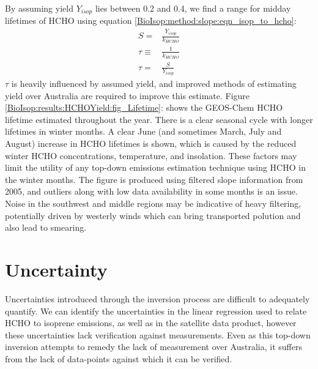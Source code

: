     By assuming yield $Y_{isop}$ lies between 0.2 and 0.4, we find a range for midday lifetimes of HCHO using equation \ref{BioIsop:method:slope:eqn_isop_to_hcho}:
    \begin{eqnarray*}
      S = & \frac{Y_{isop}}{k_{HCHO}} \\
      \tau \equiv & \frac{1}{k_{HCHO}} \\
      \tau = & \frac{S}{Y_{isop}}
    \end{eqnarray*}
    $\tau$ is heavily influenced by assumed yield, and improved methods of estimating yield over Australia are required to improve this estimate.
    Figure \ref{BioIsop:results:HCHOYield:fig_Lifetime}: shows the GEOS-Chem HCHO lifetime estimated throughout the year.
    There is a clear seasonal cycle with longer lifetimes in winter months.
    A clear June (and sometimes March, July and August) increase in HCHO lifetimes is shown, which is caused by the reduced winter HCHO concentrations, temperature, and insolation.
    These factors may limit the utility of any top-down emissions estimation technique using HCHO in the winter months.
    The figure is produced using filtered slope information from 2005, and outliers along with low data availability in some months is an issue.
    Noise in the southwest and middle regions may be indicative of heavy filtering, potentially driven by westerly winds which can bring transported polution and also lead to smearing.
    
    
    
\section{Uncertainty}
\label{BioIsop:uncertainty}
  
  Uncertainties introduced through the inversion process are difficult to adequately quantify. 
  We can identify the uncertainties in the linear regression used to relate HCHO to isoprene emissions, as well as in the satellite data product, however these uncertainties lack verification against measurements.
  Even as this top-down inversion attempts to remedy the lack of measurement over Australia, it suffers from the lack of data-points against which it can be verified.
  
